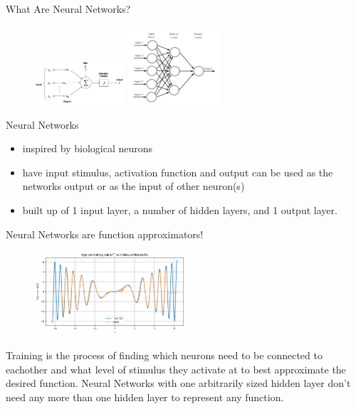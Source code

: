 \documentclass[aspectratio=169, 10pt]{beamer} %
\begin{document}
\begin{frame}{What Are Neural Networks?}
    \begin{figure}
            \centering
            \includegraphics[width=0.3\textwidth]{./NNDetailed.jpg}
    \includegraphics[width=0.3\textwidth]{./ann_overview.jpg}
    \end{figure}
    Neural Networks \begin{itemize}
        \item inspired by biological neurons
        \item have input stimulus, activation function and output can be used as the networks output or as the input of other neuron(s)
        \item built up of 1 input layer, a number of hidden layers, and 1 output layer.
    \end{itemize}
\end{frame}

\begin{frame}{Neural Networks are function approximators!}
     \begin{figure}
            \centering
    \includegraphics[width=0.5\textwidth]{./just1ExampleEstrimateion.png}
    \end{figure}   %

  Training is the process of finding which neurons need to be connected to eachother and what level of stimulus they activate at to best approximate the desired function.
  Neural Networks with one arbitrarily sized hidden layer  don't need any more than one hidden layer to represent any function.
\end{frame}
\end{document}

